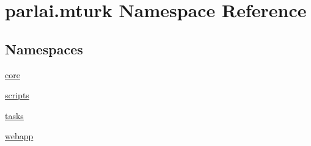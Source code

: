 \hypertarget{namespaceparlai_1_1mturk}{}\section{parlai.\+mturk Namespace Reference}
\label{namespaceparlai_1_1mturk}
\subsection*{Namespaces}
\begin{DoxyCompactItemize}
\item 
 \hyperlink{namespaceparlai_1_1mturk_1_1core}{core}
\item 
 \hyperlink{namespaceparlai_1_1mturk_1_1scripts}{scripts}
\item 
 \hyperlink{namespaceparlai_1_1mturk_1_1tasks}{tasks}
\item 
 \hyperlink{namespaceparlai_1_1mturk_1_1webapp}{webapp}
\end{DoxyCompactItemize}
